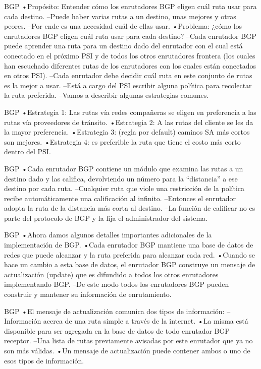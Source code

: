 \documentclass[10pt,a4paper]{report}
\begin{document}
BGP
•Propósito: Entender cómo los enrutadores BGP eligen cuál ruta usar para cada destino.
–Puede haber varias rutas a un destino, unas mejores y otras peores.
–Por ende es una necesidad cuál de ellas usar.
•Problema: ¿cómo los enrutadores BGP eligen cuál ruta usar para cada destino?
–Cada enrutador BGP puede aprender una ruta para un destino dado del enrutador con el cual está conectado en el próximo PSI y de todos los otros enrutadores frontera (los cuales han escuchado diferentes rutas de los enrutadores con los cuales están conectados en otros PSI).
–Cada enrutador debe decidir cuál ruta en este conjunto de rutas es la mejor a usar.
–Está a cargo del PSI escribir alguna política para recolectar la ruta preferida.
–Vamos a describir algunas estrategias comunes.



BGP
•Estrategia 1: Las rutas vía redes compañeras se eligen en preferencia a las rutas vía proveedores de tránsito.
•Estrategia 2: A las rutas del cliente se les da la mayor preferencia.
•Estrategia 3: (regla por default) caminos SA más cortos son mejores.
•Estrategia 4: es preferible la ruta que tiene el costo más corto dentro del PSI.


BGP
•Cada enrutador BGP contiene un módulo que examina las rutas a un destino dado y las califica, devolviendo un número para la “distancia” a ese destino por cada ruta.
–Cualquier ruta que viole una restricción de la política recibe automáticamente una calificación al infinito.
–Entonces el enrutador adopta la ruta de la distancia más corta al destino.
–La función de calificar no es parte del protocolo de BGP y la fija el administrador del sistema.



BGP
•Ahora damos algunos detalles importantes adicionales de la implementación de BGP.
•Cada enrutador BGP mantiene una base de datos de redes que puede alcanzar y la ruta preferida para alcanzar cada red.
•Cuando se hace un cambio a esta base de datos, el enrutador BGP construye un mensaje de actualización (update) que es difundido a todos los otros enrutadores implementando BGP.
–De este modo todos los enrutadores BGP pueden construir y mantener su información de enrutamiento.


BGP
•El mensaje de actualización comunica dos tipos de información:
–Información acerca de una ruta simple a través de la internet.
•La misma está disponible para ser agregada en la base de datos de todo enrutador BGP receptor.
–Una lista de rutas previamente avisadas por este enrutador que ya no son más válidas.
•Un mensaje de actualización puede contener ambos o uno de esos tipos de información.
\end{document}
